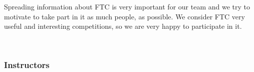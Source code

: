 	Spreading information about FTC is very important for our team and we try to motivate to take part in it as much people, as possible. We consider FTC very useful and interesting competitions, so we are very happy to participate in it. 
	\begin{figure}[H]
		\\
	\end{figure}
\fillpage

\subsubsection{Instructors}

